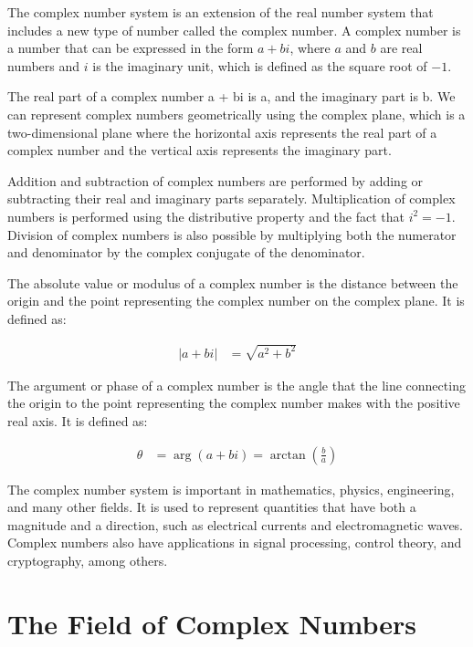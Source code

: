 \documentclass[12pt,openany]{book}
\theoremstyle{definition}
\begin{document}
	The complex number system is an extension of the real number system that includes a new type of number called the complex number. A complex number is a number that can be expressed in the form $a + bi$, where $a$ and $b$ are real numbers and $i$ is the imaginary unit, which is defined as the square root of $-1$.
	
	The real part of a complex number a + bi is a, and the imaginary part is b. We can represent complex numbers geometrically using the complex plane, which is a two-dimensional plane where the horizontal axis represents the real part of a complex number and the vertical axis represents the imaginary part.
	
	Addition and subtraction of complex numbers are performed by adding or subtracting their real and imaginary parts separately. Multiplication of complex numbers is performed using the distributive property and the fact that $i^2 = -1$. Division of complex numbers is also possible by multiplying both the numerator and denominator by the complex conjugate of the denominator.
	
	The absolute value or modulus of a complex number is the distance between the origin and the point representing the complex number on the complex plane. It is defined as:
	
	\begin{align*}
		|a+bi| &= \sqrt{a^2 + b^2}
	\end{align*}
	
	The argument or phase of a complex number is the angle that the line connecting the origin to the point representing the complex number makes with the positive real axis. It is defined as:
	
	\begin{align*}
		\theta &= \operatorname{arg}(a+bi) = \operatorname{arctan}\left(\frac{b}{a}\right)
	\end{align*}
	
	The complex number system is important in mathematics, physics, engineering, and many other fields. It is used to represent quantities that have both a magnitude and a direction, such as electrical currents and electromagnetic waves. Complex numbers also have applications in signal processing, control theory, and cryptography, among others.
	
	\newpage
	\section{The Field of Complex Numbers}
	
\end{document}
